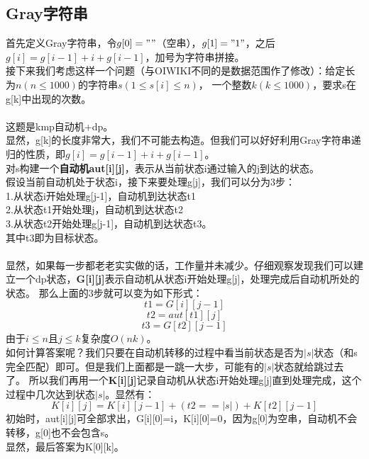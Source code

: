     \subsection{Gray字符串}
        首先定义Gray字符串，令$g[0]=""$（空串），$g[1]="1"$，之后$g[i]=g[i-1]+i+g[i-1]$，加号为字符串拼接。\\
        接下来我们考虑这样一个问题（与OIWIKI不同的是数据范围作了修改）：给定长为$n(n \le 1000)$的字符串$s(1 \le s[i] \le n)$，
        一个整数$k(k \le 1000)$，要求s在g[k]中出现的次数。\\\\
        这题是kmp自动机+dp。\\
        显然，g[k]的长度非常大，我们不可能去构造。但我们可以好好利用Gray字符串递归的性质，即$g[i]=g[i-1]+i+g[i-1]$。\\
        对s构建一个\textbf{自动机aut[i][j]}，表示从当前状态i通过输入的j到达的状态。\\
        假设当前自动机处于状态i，接下来要处理g[j]，我们可以分为3步：\\
        1.从状态i开始处理g[j-1]，自动机到达状态t1\\
        2.从状态t1开始处理j，自动机到达状态t2\\
        3.从状态t2开始处理g[j-1]，自动机到达状态t3。\\
        其中t3即为目标状态。\\\\
        显然，如果每一步都老老实实做的话，工作量并未减少。仔细观察发现我们可以建立一个dp状态，\textbf{G[i][j]}表示自动机从状态i开始处理g[j]，处理完成后自动机所处的状态。
        那么上面的3步就可以变为如下形式：
        $$t1 = G[i][j-1]$$
        $$t2 = aut[t1][j]$$
        $$t3 = G[t2][j-1]$$
        由于$i \le n$且$j \le k$复杂度$O(nk)$。\\
        如何计算答案呢？我们只要在自动机转移的过程中看当前状态是否为$|s|$状态（和s完全匹配）即可。但是我们上面都是一跳一大步，可能有的$|s|$状态就给跳过去了。
        所以我们再用一个\textbf{K[i][j]}记录自动机从状态i开始处理g[j]直到处理完成，这个过程中几次达到状态$|s|$。显然有：
        $$K[i][j] = K[i][j-1] + (t2 == |s|) + K[t2][j-1]$$
        初始时，aut[i][j]可全部求出，G[i][0]=i，K[i][0]=0，因为g[0]为空串，自动机不会转移，g[0]也不会包含s。\\
        显然，最后答案为K[0][k]。
